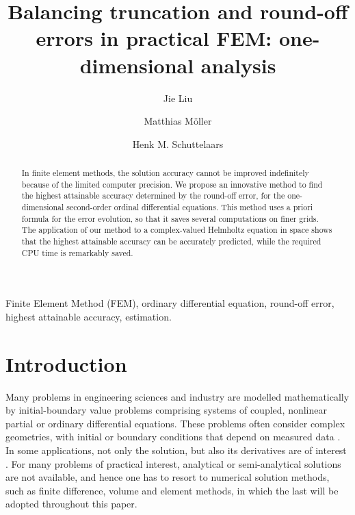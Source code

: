 \documentclass[review,3p]{elsarticle}
\begin{document}
\begin{frontmatter}

\title{Balancing truncation and round-off errors in practical FEM: one-dimensional analysis}

 \author[1]{Jie Liu}
 \author[1]{Matthias Möller}
 \author[1]{Henk M. Schuttelaars}
 
 \address[1]{Delft Institute of Applied Mathematics\\ Delft University of Technology\\ Van Mourik Broekmanweg 6, 2628 XE Delft, The Netherlands}

\begin{abstract}
In finite element methods, the solution accuracy cannot be improved indefinitely because of the limited computer precision. We propose an innovative method to find the highest attainable accuracy determined by the round-off error, for the one-dimensional second-order ordinal differential equations. This method uses a priori formula for the error evolution, so that it saves several computations on finer grids. The application of our method to a complex-valued Helmholtz equation in space shows that the highest attainable accuracy can be accurately predicted, while the required CPU time is remarkably saved. 
\end{abstract}


\begin{keyword}
Finite Element Method (FEM), ordinary differential equation, round-off error, highest attainable accuracy, estimation.
\end{keyword}

\end{frontmatter}

\section{Introduction}

Many problems in engineering sciences and industry are modelled mathematically by initial-boundary value problems comprising systems of coupled, nonlinear partial or ordinary differential equations. These problems often consider complex geometries, with initial or boundary conditions that depend on measured data \cite{Kumar2016}. 
In some applications, not only the solution, but also its derivatives are of interest \cite{Kumar2016,carey1982derivative}.
For many problems of practical interest, analytical or semi-analytical solutions are not available, and hence one has to resort to numerical solution methods, such as finite difference, volume and element methods, in which the last will be adopted throughout this paper.
\end{document}
